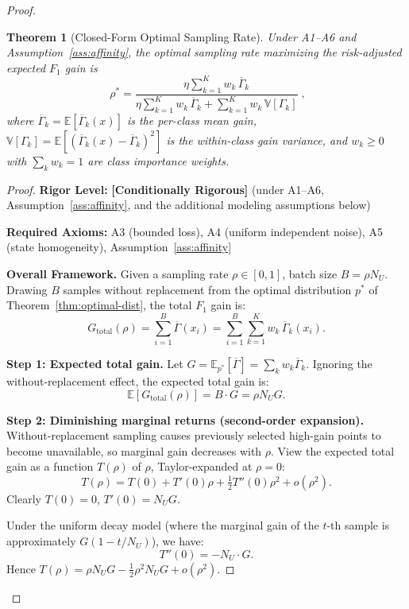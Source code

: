 \documentclass[12pt,a4paper]{article}
\newtheorem{theorem}{Theorem}[section]
\newcommand{\E}{\mathbb{E}}
\newcommand{\V}{\mathbb{V}}
\newcommand{\conditionallyrigorous}{\textbf{[Conditionally Rigorous]}}
\begin{document}
\begin{proof}
\begin{theorem}[Closed-Form Optimal Sampling Rate]
\label{thm:optimal-rate}
Under A1--A6 and Assumption~\ref{ass:affinity}, the optimal sampling rate maximizing the risk-adjusted expected $F_1$ gain is
\begin{equation}\label{eq:rho-star}
    \boxed{\;
    \rho^* =
    \frac{\eta\displaystyle\sum_{k=1}^{K} w_k\,\overline{\Gamma}_k}
         {\eta\displaystyle\sum_{k=1}^{K} w_k\,\overline{\Gamma}_k
          + \displaystyle\sum_{k=1}^{K} w_k\,\V[\Gamma_k]}
    \;},
\end{equation}
where $\overline{\Gamma}_k=\E[\overline{\Gamma}_k(x)]$ is the per-class mean gain,
$\V[\Gamma_k]=\E[(\overline{\Gamma}_k(x)-\overline{\Gamma}_k)^2]$ is the within-class gain variance,
and $w_k\geq0$ with $\sum_k w_k=1$ are class importance weights.
\end{theorem}

\begin{proof}
\textbf{Rigor Level:} \conditionallyrigorous
\quad (under A1--A6, Assumption~\ref{ass:affinity}, and the additional modeling assumptions below)

\textbf{Required Axioms:} A3 (bounded loss), A4 (uniform independent noise), A5 (state homogeneity),
Assumption~\ref{ass:affinity}

\textbf{Overall Framework.}
Given a sampling rate $\rho\in[0,1]$, batch size $B=\rho N_U$.
Drawing $B$ samples without replacement from the optimal distribution $p^*$ of Theorem~\ref{thm:optimal-dist},
the total $F_1$ gain is:
\[
G_{\text{total}}(\rho) = \sum_{i=1}^B \overline{\Gamma}(x_i)
= \sum_{i=1}^B \sum_{k=1}^K w_k\,\overline{\Gamma}_k(x_i).
\]

\textbf{Step 1: Expected total gain.}
Let $G = \E_{p^*}[\overline{\Gamma}] = \sum_k w_k\overline{\Gamma}_k$.
Ignoring the without-replacement effect, the expected total gain is:
\[
\E[G_{\text{total}}(\rho)] = B\cdot G = \rho N_U G.
\]

\textbf{Step 2: Diminishing marginal returns (second-order expansion).}
Without-replacement sampling causes previously selected high-gain points to become unavailable, so marginal gain decreases with $\rho$.
View the expected total gain as a function $T(\rho)$ of $\rho$, Taylor-expanded at $\rho=0$:
\[
T(\rho) = T(0) + T'(0)\rho + \tfrac12 T''(0)\rho^2 + o(\rho^2).
\]
Clearly $T(0)=0$, $T'(0)=N_U G$.

Under the uniform decay model (where the marginal gain of the $t$-th sample is approximately $G(1-t/N_U)$), we have:
\[
T''(0) = -N_U\cdot G.
\]
Hence $T(\rho) = \rho N_U G - \tfrac12\rho^2 N_U G + o(\rho^2)$.


\end{proof}
\end{proof}
\end{document}
